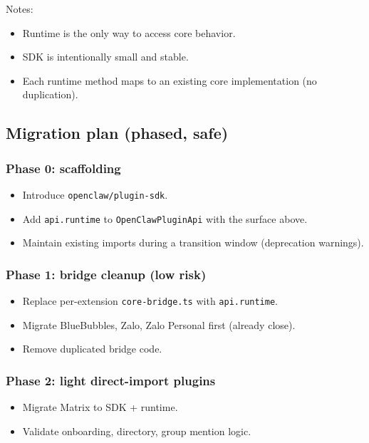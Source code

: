Notes:

\begin{itemize}
  \item Runtime is the only way to access core behavior.
  \item SDK is intentionally small and stable.
  \item Each runtime method maps to an existing core implementation (no duplication).
\end{itemize}


\subsection{Migration plan (phased, safe)}


\subsubsection{Phase 0: scaffolding}


\begin{itemize}
  \item Introduce \texttt{openclaw/plugin-sdk}.
  \item Add \texttt{api.runtime} to \texttt{OpenClawPluginApi} with the surface above.
  \item Maintain existing imports during a transition window (deprecation warnings).
\end{itemize}


\subsubsection{Phase 1: bridge cleanup (low risk)}


\begin{itemize}
  \item Replace per-extension \texttt{core-bridge.ts} with \texttt{api.runtime}.
  \item Migrate BlueBubbles, Zalo, Zalo Personal first (already close).
  \item Remove duplicated bridge code.
\end{itemize}


\subsubsection{Phase 2: light direct-import plugins}


\begin{itemize}
  \item Migrate Matrix to SDK + runtime.
  \item Validate onboarding, directory, group mention logic.
\end{itemize}


